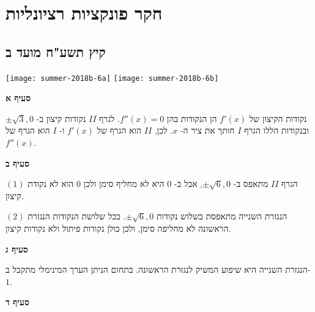 


\chapter{חקר פונקציות רציונליות}


\section{קיץ תשע"ח מועד ב}

\begin{center}
\texttt{[image: summer-2018b-6a]}
\texttt{[image: summer-2018b-6b]}
\end{center}

\vspace{-4ex}

\textbf{סעיף א}

נקודות הקיצון של
$f'(x)$
הן הנקודות בהן 
$f''(x)=0$.
לגרף
$II$
נקודות קיצון ב-%
$\pm\sqrt{3},0$
ובנקודות הללו הגרף
$I$
חותך את ציר ה-%
$x$.
לכן, 
$II$
הוא הגרף של
$f'(x)$
ו-%
$I$
הוא הגרף של
$f''(x)$.

\textbf{סעיף ב}

$(1)$
הגרף 
$II$
מתאפס ב-%
$\pm\sqrt{6},0$,
אבל ב-%
$0$
היא לא מחליף סימן ולכן
$0$
הוא לא נקודת קיצון.

$(2)$
הנגזרת השנייה מתאפסת בשלוש נקודות
$\pm\sqrt{6},0$.
בכל שלושת הנקודות הנגזרת הראשונה לא מחליפה סימן, ולכן כולן נקודות פיתול ולא נקודות קיצון.

\np

\textbf{סעיף ג}

הנגזרת השנייה היא שיפוע המשיק לנגזרת הראשונה. בתחום הניתן הערך המינימלי מתקבל ב-%
$1$.


\textbf{סעיף ד}

